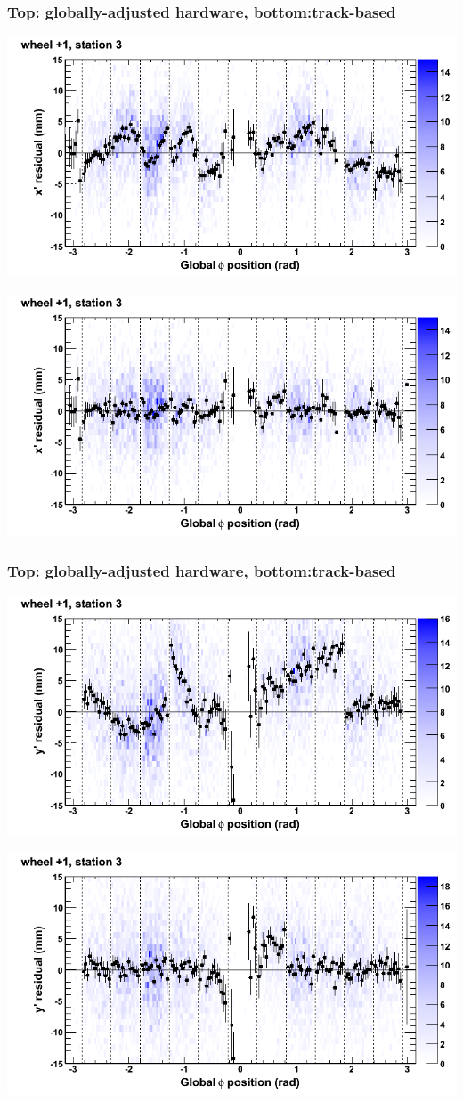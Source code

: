 \documentclass[compress]{beamer}
\begin{document}
\begin{frame}
\frametitle{Top: globally-adjusted hardware, bottom:track-based}
\includegraphics[width=0.7\linewidth]{NOV4_mapplots_HW/DTvsphi_st3whD_x.png}

\includegraphics[width=0.7\linewidth]{NOV4_mapplots/DTvsphi_st3whD_x.png}
\end{frame}

\begin{frame}
\frametitle{Top: globally-adjusted hardware, bottom:track-based}
\includegraphics[width=0.7\linewidth]{NOV4_mapplots_HW/DTvsphi_st3whD_y.png}

\includegraphics[width=0.7\linewidth]{NOV4_mapplots/DTvsphi_st3whD_y.png}
\end{frame}
\end{document}
